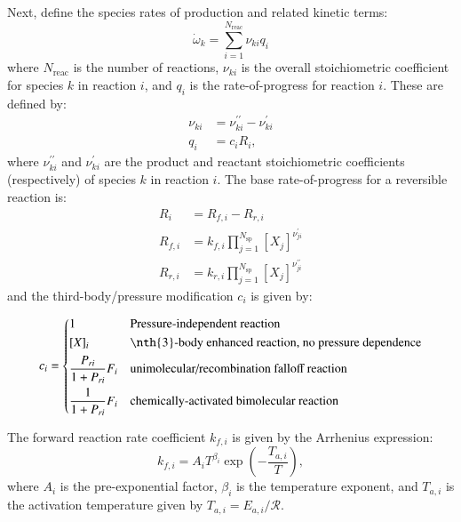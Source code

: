 \documentclass[preprint,12pt]{elsarticle}
\begin{document}
Next, define the species rates of production and related kinetic terms:
\begin{equation}
\dot{\omega}_k = \sum_{i=1}^{N_{\text{reac}}} \nu_{k i} q_i
\end{equation}
where $N_{\text{reac}}$ is the number of reactions, $\nu_{k i}$ is the overall stoichiometric coefficient for species $k$ in reaction $i$, and $q_i$ is the rate-of-progress for reaction $i$.
These are defined by:
\begin{align}
\nu_{k i} &= \nu_{k i}^{\prime \prime} - \nu_{k i}^{\prime}  \\
q_i &= c_i R_i ,
\end{align}
where $\nu_{k i}^{\prime \prime}$ and $\nu_{k i}^{\prime}$ are the product and reactant stoichiometric coefficients (respectively) of species $k$ in reaction $i$.
The base rate-of-progress for a reversible reaction is:
\begin{align}
R_i &= R_{f, i} - R_{r, i} \\
R_{f, i} &= k_{f, i} \prod_{j = 1}^{N_{\text{sp}}} [X_j]^{\nu_{j i}^{\prime}} \\
R_{r, i} &= k_{r, i} \prod_{j = 1}^{N_{\text{sp}}} [X_j]^{\nu_{j i}^{\prime \prime}}
\end{align}
and the third-body\slash pressure modification $c_i$ is given by:

\begin{equation}
c_i = \begin{dcases}
	1 &\text{Pressure-independent reaction} \\
	[X]_i &\text{\nth{3}-body enhanced reaction, no pressure dependence} \\
	\frac{P_{r i}}{1 + P_{r i}} F_i &\text{unimolecular/recombination falloff reaction} \\
	\frac{1}{1 + P_{r i}} F_i &\text{chemically-activated bimolecular reaction}
	\end{dcases}
\label{e:rxn_pressure}
\end{equation}

The forward reaction rate coefficient $k_{f, i}$ is given by the Arrhenius expression:
\begin{equation}
\label{e:arrhenius}
	k_{f, i} = A_i T^{\beta_i} \exp \left( - \frac{T_{a, i}}{T} \right),
\end{equation}
where $A_i$ is the pre-exponential factor, $\beta_i$ is the temperature exponent, and $T_{a, i}$ is the activation temperature given by $T_{a, i} = E_{a, i} / \mathcal{R}$.
\end{document}
